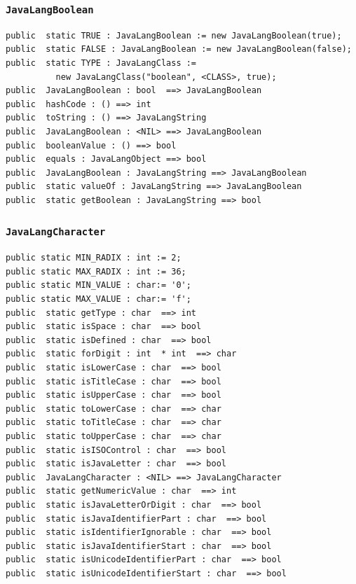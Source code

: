 \documentclass[\pformat,12pt]{article}
\begin{document}
\subsubsection{\texttt{JavaLangBoolean}}
\begin{small}
\begin{verbatim}
public  static TRUE : JavaLangBoolean := new JavaLangBoolean(true);
public  static FALSE : JavaLangBoolean := new JavaLangBoolean(false);
public  static TYPE : JavaLangClass := 
          new JavaLangClass("boolean", <CLASS>, true);
public  JavaLangBoolean : bool  ==> JavaLangBoolean
public  hashCode : () ==> int
public  toString : () ==> JavaLangString
public  JavaLangBoolean : <NIL> ==> JavaLangBoolean
public  booleanValue : () ==> bool
public  equals : JavaLangObject ==> bool
public  JavaLangBoolean : JavaLangString ==> JavaLangBoolean
public  static valueOf : JavaLangString ==> JavaLangBoolean
public  static getBoolean : JavaLangString ==> bool
\end{verbatim}
\end{small}

\subsubsection{\texttt{JavaLangCharacter}}
\begin{small}
\begin{verbatim}
public static MIN_RADIX : int := 2;
public static MAX_RADIX : int := 36;
public static MIN_VALUE : char:= '0';
public static MAX_VALUE : char:= 'f';
public  static getType : char  ==> int
public  static isSpace : char  ==> bool
public  static isDefined : char  ==> bool
public  static forDigit : int  * int  ==> char
public  static isLowerCase : char  ==> bool
public  static isTitleCase : char  ==> bool
public  static isUpperCase : char  ==> bool
public  static toLowerCase : char  ==> char
public  static toTitleCase : char  ==> char
public  static toUpperCase : char  ==> char
public  static isISOControl : char  ==> bool
public  static isJavaLetter : char  ==> bool
public  JavaLangCharacter : <NIL> ==> JavaLangCharacter
public  static getNumericValue : char  ==> int
public  static isJavaLetterOrDigit : char  ==> bool
public  static isJavaIdentifierPart : char  ==> bool
public  static isIdentifierIgnorable : char  ==> bool
public  static isJavaIdentifierStart : char  ==> bool
public  static isUnicodeIdentifierPart : char  ==> bool
public  static isUnicodeIdentifierStart : char  ==> bool
\end{verbatim}
\end{small}
\end{document}
